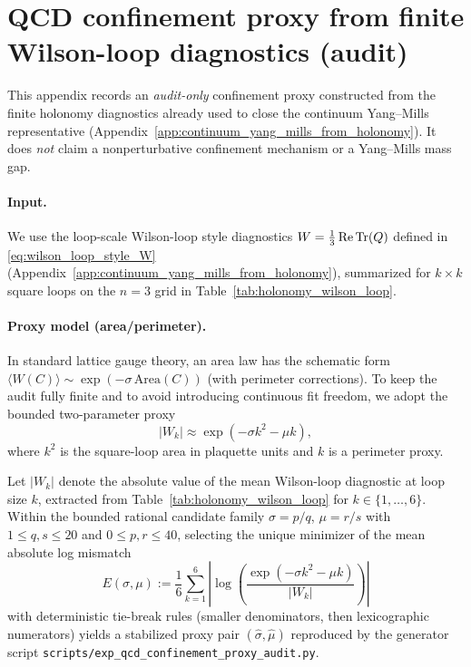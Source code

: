 \section{QCD confinement proxy from finite Wilson-loop diagnostics (audit)}
\label{app:qcd_confinement_proxy_audit}

This appendix records an \emph{audit-only} confinement proxy constructed from the finite holonomy diagnostics already used to close the continuum Yang--Mills representative (Appendix~\ref{app:continuum_yang_mills_from_holonomy}).
It does \emph{not} claim a nonperturbative confinement mechanism or a Yang--Mills mass gap.

\paragraph{Input.}
We use the loop-scale Wilson-loop style diagnostics $W=\frac13\operatorname{Re}\mathrm{Tr}(Q)$ defined in \eqref{eq:wilson_loop_style_W} (Appendix~\ref{app:continuum_yang_mills_from_holonomy}), summarized for $k\times k$ square loops on the $n=3$ grid in Table~\ref{tab:holonomy_wilson_loop}.

\paragraph{Proxy model (area/perimeter).}
\AuditTag In standard lattice gauge theory, an area law has the schematic form $\langle W(C)\rangle\sim \exp(-\sigma\,\mathrm{Area}(C))$ (with perimeter corrections).
To keep the audit fully finite and to avoid introducing continuous fit freedom, we adopt the bounded two-parameter proxy
\[
|W_k|\approx \exp(-\sigma k^2-\mu k),
\]
where $k^2$ is the square-loop area in plaquette units and $k$ is a perimeter proxy.

\begin{proposition}\label{prop:qcd_confinement_proxy_selection}
\AuditTag Let $|W_k|$ denote the absolute value of the mean Wilson-loop diagnostic at loop size $k$, extracted from Table~\ref{tab:holonomy_wilson_loop} for $k\in\{1,\dots,6\}$.
Within the bounded rational candidate family $\sigma=p/q$, $\mu=r/s$ with $1\le q,s\le 20$ and $0\le p,r\le 40$, selecting the unique minimizer of the mean absolute log mismatch
\[
E(\sigma,\mu):=\frac{1}{6}\sum_{k=1}^6\left|\log\!\left(\frac{\exp(-\sigma k^2-\mu k)}{|W_k|}\right)\right|
\]
with deterministic tie-break rules (smaller denominators, then lexicographic numerators) yields a stabilized proxy pair $(\widehat\sigma,\widehat\mu)$ reproduced by the generator script \texttt{scripts/exp\_qcd\_confinement\_proxy\_audit.py}.
\end{proposition}

